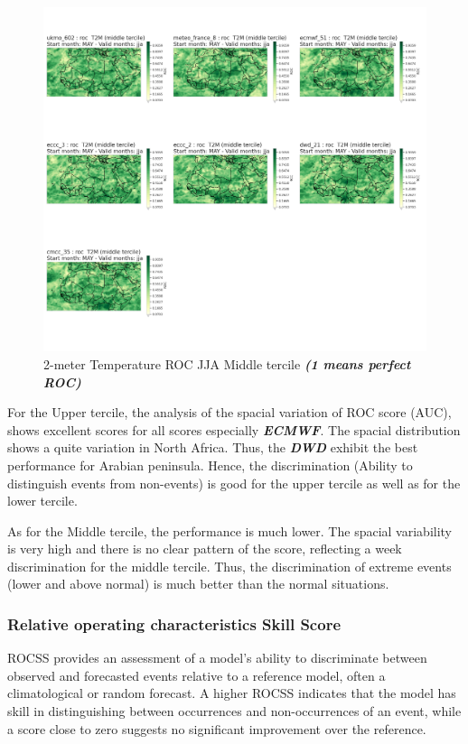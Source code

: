 \begin{figure}[H]
    \centering
    \includegraphics[width=1\linewidth]{plots/prob/roc/roc_jja_t2m_middle.png}
    \caption{2-meter Temperature ROC JJA Middle tercile \textbf{\textit{(1 means perfect ROC)}}}
\end{figure}

For the Upper tercile, the analysis of the spacial variation of ROC score (AUC), shows excellent scores for all scores especially \textbf{\textit{ECMWF}}. The spacial distribution shows a quite variation in North Africa. Thus, the \textbf{\textit{DWD}} exhibit the best performance for Arabian peninsula. Hence, the discrimination (Ability to distinguish
events from non-events) is good for the upper tercile as well as for the lower tercile.

As for the Middle tercile, the performance is much lower. The spacial variability is very high and there is no clear pattern of the score, reflecting a week discrimination for the middle tercile. Thus, the discrimination of extreme events (lower and above normal) is much better than the normal situations.



\subsubsection{Relative operating characteristics Skill Score}
ROCSS provides an assessment of a model's ability to discriminate between observed and forecasted events relative to a reference model, often a climatological or random forecast. A higher ROCSS indicates that the model has skill in distinguishing between occurrences and non-occurrences of an event, while a score close to zero suggests no significant improvement over the reference.

